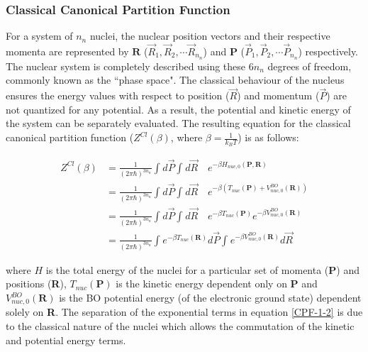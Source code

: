 \subsubsection{Classical Canonical Partition Function}

For a system of $n_n$ nuclei, the nuclear position vectors and their respective momenta are represented by $\textbf{R}$ ({$\vec{R}_1,\vec{R}_2,\cdots \vec{R}_{n_n}$}) and $\textbf{P}$ ({$\vec{P}_1,\vec{P}_2,\cdots \vec{P}_{n_n}$}) respectively. The nuclear system is completely described using these $6n_n$ degrees of freedom, commonly known as the ``phase space". The classical behaviour of the nucleus ensures the energy values with respect to position ($\vec{R}$) and momentum ($\vec{P}$) are not quantized for any potential. As a result, the potential and kinetic energy of the system can be separately evaluated. The resulting equation for the classical canonical partition function ($Z^{Cl}(\beta)$, where $\beta= \frac{1}{k_{B}T}$) is as follows:

\begin{align}
    Z^{Cl}(\beta)&=\frac{1}{(2\pi\hbar)^{3n_n}} \int_{}^{}d\vec{P}\int_{}^{}d\vec{R} \quad e^{-\beta H_{nuc,0}(\textbf{P},\textbf{R})}\label{CPF-1-1}\\ 
    &= \frac{1}{(2\pi\hbar)^{3n_n}} \int_{}^{}d\vec{P}\int_{}^{}d\vec{R} \quad e^{-\beta(T_{nuc}(\textbf{P})+ V^{BO}_{nuc,0}(\textbf{R}))}\label{CPF-1-2}\\
    &= \frac{1}{(2\pi\hbar)^{3n_n}} \int_{}^{}d\vec{P}\int_{}^{}d\vec{R}\quad e^{-\beta T_{nuc}(\textbf{P})}e^{-\beta V^{BO}_{nuc,0}(\textbf{R})}\label{CPF-1-3}\\
    &= \frac{1}{(2\pi\hbar)^{3n_n}} \int_{}^{}e^{-\beta T_{nuc}(\textbf{R})} d\vec{P}\int_{}^{}e^{-\beta V^{BO}_{nuc,0}(\textbf{R})}d\vec{R}\label{CPF-1-4}     
\end{align}

\noindent where $H$ is the total energy of the nuclei for a particular set of momenta (\textbf{P}) and positions (\textbf{R}), $T_{nuc}(\textbf{P})$ is the kinetic energy dependent only on \textbf{P} and $V^{BO}_{nuc,0}(\textbf{R})$   is the BO potential energy (of the electronic ground state) dependent solely on \textbf{R}. The separation of the exponential terms in equation \ref{CPF-1-2} is due to the classical nature of the nuclei which allows the commutation of the kinetic and potential energy terms. 


